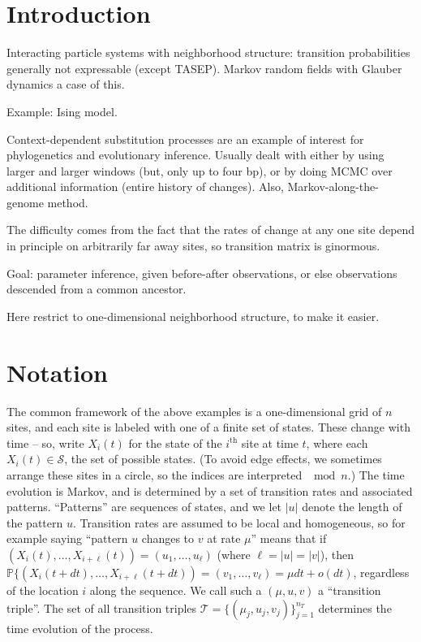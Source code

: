 \documentclass{article}
\renewcommand{\P}{\mathbb{P}}
\newcommand{\calS}{\mathcal{S}}  %
\newcommand{\calT}{\mathcal{T}}  %
\theoremstyle{definition}
\begin{document}
\section*{Introduction}

Interacting particle systems with neighborhood structure: transition probabilities generally not expressable (except TASEP).
Markov random fields with Glauber dynamics a case of this.

Example: Ising model.

Context-dependent substitution processes are an example of interest for phylogenetics and evolutionary inference.
Usually dealt with either by using larger and larger windows (but, only up to four bp),
or by doing MCMC over additional information (entire history of changes).
Also, Markov-along-the-genome method.

The difficulty comes from the fact that the rates of change at any one site depend in principle on arbitrarily far away sites,
so transition matrix is ginormous.

Goal: parameter inference, given before-after observations, or else observations descended from a common ancestor.

Here restrict to one-dimensional neighborhood structure,
to make it easier.

\section*{Notation}

The common framework of the above examples is a one-dimensional grid of $n$ sites,
and each site is labeled with one of a finite set of states.
These change with time -- so, write $X_i(t)$ for the state of the $i^\mathrm{th}$ site at time $t$,
where each $X_i(t) \in \calS$, the set of possible states.
(To avoid edge effects, we sometimes arrange these sites in a circle, so the indices are interpreted $\mod n$.)
The time evolution is Markov, and is determined by a set of transition rates and associated patterns.  
``Patterns'' are sequences of states, and we let $|u|$ denote the length of the pattern $u$.
Transition rates are assumed to be local and homogeneous, so for example saying ``pattern $u$ changes to $v$ at rate $\mu$''
means that if $(X_i(t), \ldots, X_{i+\ell}(t)) = (u_1, \ldots, u_\ell)$ (where $\ell=|u|=|v|$),
then $\P\{(X_i(t+dt), \ldots, X_{i+\ell}(t+dt)) = (v_1, \ldots, v_\ell) = \mu dt + o(dt)$,
regardless of the location $i$ along the sequence.
We call such a $(\mu,u,v)$ a ``transition triple''.
The set of all transition triples $\calT = \{ (\mu_j,u_j,v_j) \}_{j=1}^{n_T}$ 
determines the time evolution of the process.
\end{document}
